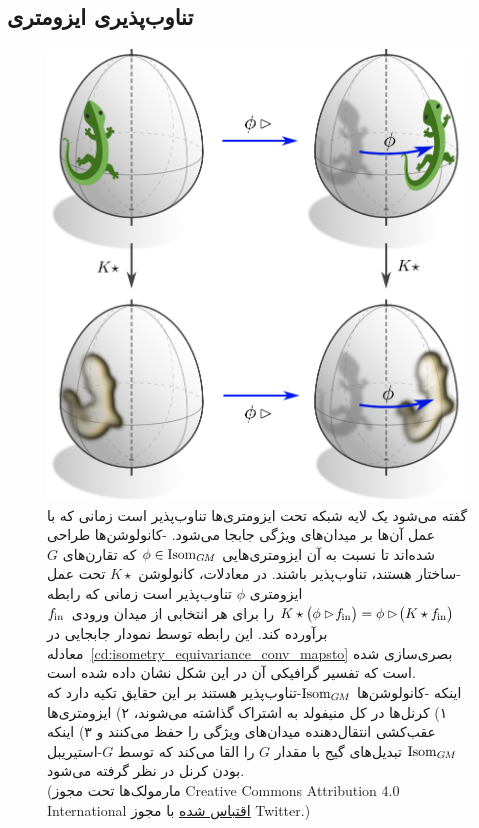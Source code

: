 

\subsection{تناوب‌پذیری ایزومتری}
\label{sec:gauge_conv_isom_equiv}


\begin{figure}
	\centering
	\includegraphics[width=.56\textwidth]{figures/lizard_conv_egg.pdf}
	\captionsetup{width=.89\textwidth}
	\caption[]{\small
		گفته می‌شود یک لایه شبکه تحت ایزومتری‌ها تناوب‌پذیر است زمانی که با عمل آن‌ها بر میدان‌های ویژگی جابجا می‌شود.
		\GM-کانولوشن‌ها طراحی شده‌اند تا نسبت به آن ایزومتری‌هایی $\phi\in \operatorname{Isom}_{G\mkern-1.4muM}$ که تقارن‌های $G$-ساختار هستند، تناوب‌پذیر باشند.
		در معادلات، کانولوشن $K\star$ تحت عمل ایزومتری $\phi$ تناوب‌پذیر است زمانی که رابطه
		${K \star \big( \phi\rhd\! f_\textup{\;\!\!in} \big) = \phi\rhd\! \big(K \star f_\textup{\;\!\!in} \big)}$
		را برای هر انتخابی از میدان ورودی~$f_\textup{\;\!\!in}$ برآورده کند.
		این رابطه توسط نمودار جابجایی در معادله~\eqref{cd:isometry_equivariance_conv_mapsto} بصری‌سازی شده است که تفسیر گرافیکی آن در این شکل نشان داده شده است.
		\\[1ex]
		اینکه \GM-کانولوشن‌ها $\operatorname{Isom}_{G\mkern-1.4muM}$-تناوب‌پذیر هستند بر این حقایق تکیه دارد که
		۱) کرنل‌ها در کل منیفولد به اشتراک گذاشته می‌شوند،
		۲) ایزومتری‌ها عقب‌کشی انتقال‌دهنده میدان‌های ویژگی را حفظ می‌کنند و
		۳) اینکه $\operatorname{Isom}_{G\mkern-1.4muM}$ تبدیل‌های گیج با مقدار $G$ را القا می‌کند که توسط $G$-استیریبل بودن کرنل در نظر گرفته می‌شود.
		{\\
			\color{gray}
			\scriptsize
			(مارمولک‌ها تحت مجوز Creative Commons Attribution 4.0 International
			\href{https://github.com/twitter/twemoji/blob/gh-pages/LICENSE-GRAPHICS}{\underline{اقتباس شده}}
			با مجوز Twitter.)
		}
		\\[0ex]
	}
	\label{fig:lizard_conv_egg}
\end{figure}


